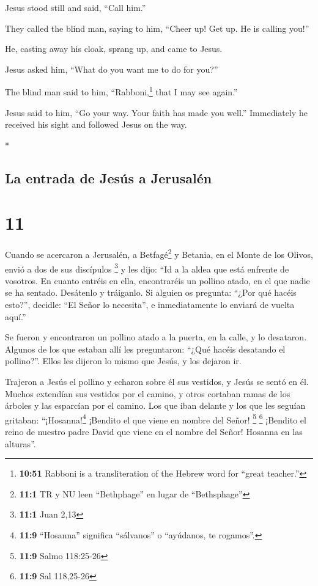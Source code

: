 \begin{paracol}{2}
\begin{otherlanguage}{english}
 Jesus stood still and said, ``Call him.''

They called the blind man, saying to him, ``Cheer up! Get up. He is
calling you!''

 He, casting away his cloak, sprang up, and came to
Jesus.

 Jesus asked him, ``What do you want me to do for you?''

The blind man said to him, ``Rabboni,\footnote{\textbf{10:51} Rabboni is
  a transliteration of the Hebrew word for ``great teacher.''} that I
may see again.''

 Jesus said to him, ``Go your way. Your faith has made
you well.'' Immediately he received his sight and followed Jesus on the
way.

\end{otherlanguage}

\switchcolumn[0]*

\hypertarget{la-entrada-de-jesuxfas-a-jerusaluxe9n}{%
\subsection{La entrada de Jesús a
Jerusalén}\label{la-entrada-de-jesuxfas-a-jerusaluxe9n}}

\hypertarget{section-20}{%
\section{11}\label{section-20}}

 Cuando se acercaron a Jerusalén, a Betfagé\footnote{\textbf{11:1}
  TR y NU leen ``Bethphage'' en lugar de ``Bethsphage''} y Betania, en
el Monte de los Olivos, envió a dos de sus discípulos \footnote{\textbf{11:1}
  Juan 2,13}  y les dijo: ``Id a la aldea que está
enfrente de vosotros. En cuanto entréis en ella, encontraréis un pollino
atado, en el que nadie se ha sentado. Desátenlo y tráiganlo.
 Si alguien os pregunta: ``¿Por qué hacéis esto?'',
decidle: ``El Señor lo necesita'', e inmediatamente lo enviará de vuelta
aquí.''

 Se fueron y encontraron un pollino atado a la puerta, en
la calle, y lo desataron.  Algunos de los que estaban allí
les preguntaron: ``¿Qué hacéis desatando el pollino?''. 
Ellos les dijeron lo mismo que Jesús, y los dejaron ir.

 Trajeron a Jesús el pollino y echaron sobre él sus
vestidos, y Jesús se sentó en él.  Muchos extendían sus
vestidos por el camino, y otros cortaban ramas de los árboles y las
esparcían por el camino.  Los que iban delante y los que
les seguían gritaban: ``¡Hosanna!\footnote{\textbf{11:9} ``Hosanna''
  significa ``sálvanos'' o ``ayúdanos, te rogamos''.} ¡Bendito el que
viene en nombre del Señor! \footnote{\textbf{11:9} Salmo 118:25-26}
\footnote{\textbf{11:9} Sal 118,25-26}  ¡Bendito el reino
de nuestro padre David que viene en el nombre del Señor! Hosanna en las
alturas''.


\end{paracol}
